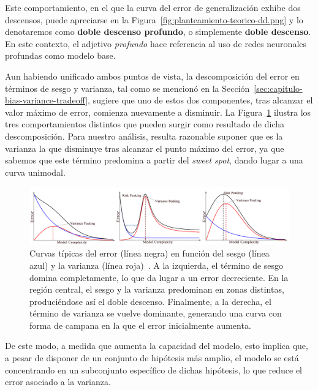Este comportamiento, en el que la curva del error de generalización exhibe dos descensos, puede apreciarse en la Figura~\ref{fig:planteamiento-teorico-dd.png} y lo denotaremos como \textbf{doble descenso profundo}, o simplemente \textbf{doble descenso}. En este contexto, el adjetivo \textit{profundo} hace referencia al uso de redes neuronales profundas como modelo base.\newline

Aun habiendo unificado ambos puntos de vista, la descomposición del error en términos de sesgo y varianza, tal como se mencionó en la Sección~\ref{sec:capitulo-bias-variance-tradeoff}, sugiere que uno de estos dos componentes, tras alcanzar el valor máximo de error, comienza nuevamente a disminuir. La Figura~\ref{fig:bias-variance-peak} ilustra los tres comportamientos distintos que pueden surgir como resultado de dicha descomposición. Para nuestro análisis, resulta razonable suponer que es la varianza la que disminuye tras alcanzar el punto máximo del error, ya que sabemos que este término predomina a partir del \textit{sweet spot}, dando lugar a una curva unimodal.\newline

\begin{figure}[h]
    \centering
    \includegraphics[width=0.8\linewidth]{img/bias-variance-peak.png}
    \caption[Curvas típicas del error en función del sesgo y la varianza~\cite{Yang2020}.]{Curvas típicas del error (línea negra) en función del sesgo (línea azul) y la varianza (línea roja)~\cite{Yang2020}. A la izquierda, el término de sesgo domina completamente, lo que da lugar a un error decreciente. En la región central, el sesgo y la varianza predominan en zonas distintas, produciéndose así el doble descenso. Finalmente, a la derecha, el término de varianza se vuelve dominante, generando una curva con forma de campana en la que el error inicialmente aumenta.}\label{fig:bias-variance-peak}
\end{figure}

De este modo, a medida que aumenta la capacidad del modelo, esto implica que, a pesar de disponer de un conjunto de hipótesis más amplio, el modelo se está concentrando en un subconjunto específico de dichas hipótesis, lo que reduce el error asociado a la varianza.\newline

